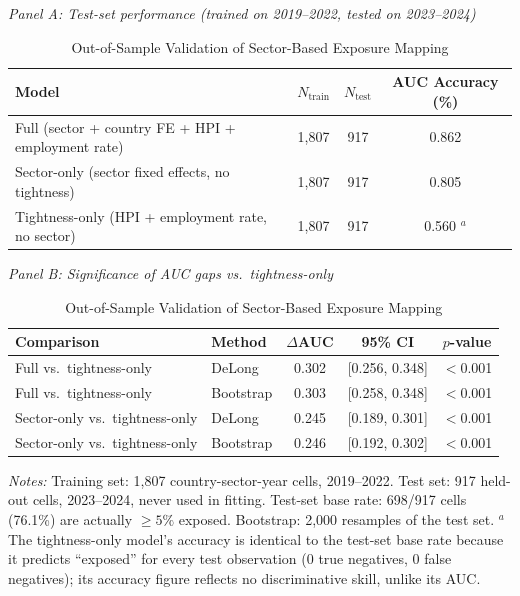 \documentclass[12pt,a4paper]{article}
\newcommand{\sym}[1]{\ensuremath{^{#1}}}   %
\begin{document}
\begin{table}[htbp]
\caption{Out-of-Sample Validation of Sector-Based Exposure Mapping}
\label{tab:oosvalidation}
\begin{threeparttable}
\smallskip
\textit{Panel A: Test-set performance (trained on 2019--2022, tested on 2023--2024)}
\smallskip
\begin{tabular}{lccc}
\toprule
Model & $N_{\text{train}}$ & $N_{\text{test}}$ & AUC \quad Accuracy (\%) \\
\midrule
Full (sector + country FE + HPI + employment rate) & 1,807 & 917 & 0.862 \quad 83.9 \\
Sector-only (sector fixed effects, no tightness)    & 1,807 & 917 & 0.805 \quad 80.7 \\
Tightness-only (HPI + employment rate, no sector)   & 1,807 & 917 & 0.560 \quad 76.1\sym{a} \\
\bottomrule
\end{tabular}

\bigskip
\textit{Panel B: Significance of AUC gaps vs.\ tightness-only}
\smallskip
\begin{tabular}{llccc}
\toprule
Comparison & Method & $\Delta$AUC & 95\% CI & $p$-value \\
\midrule
Full vs.\ tightness-only         & DeLong    & 0.302 & [0.256, 0.348] & $<$0.001 \\
Full vs.\ tightness-only         & Bootstrap & 0.303 & [0.258, 0.348] & $<$0.001 \\
Sector-only vs.\ tightness-only  & DeLong    & 0.245 & [0.189, 0.301] & $<$0.001 \\
Sector-only vs.\ tightness-only  & Bootstrap & 0.246 & [0.192, 0.302] & $<$0.001 \\
\bottomrule
\end{tabular}
\begin{tablenotes}
\footnotesize
\item \textit{Notes:} Training set: 1,807 country-sector-year cells, 2019--2022.
  Test set: 917 held-out cells, 2023--2024, never used in fitting.  Test-set
  base rate: 698/917 cells (76.1\%) are actually $\geq 5\%$ exposed.
  Bootstrap: 2,000 resamples of the test set.
  \sym{a} The tightness-only model's accuracy is identical to the test-set
  base rate because it predicts ``exposed'' for every test observation
  (0 true negatives, 0 false negatives); its accuracy figure reflects no
  discriminative skill, unlike its AUC.
\end{tablenotes}
\end{threeparttable}
\end{table}
\end{document}
